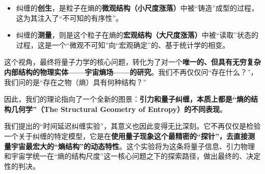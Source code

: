 \documentclass[12pt]{article}
\begin{document}
\begin{itemize}
    \item   纠缠的\textbf{创生}，是粒子在熵的\textbf{微观结构（小尺度涨落）}中被``铸造''成型的过程，这为其注入了``不可知的有序性''。
    \item   纠缠的\textbf{测量}，则是这个粒子在熵的\textbf{宏观结构（大尺度涨落）}中被``读取''状态的过程，这是一个``微观不可知''向``宏观确定''的、基于统计学的相变。
\end{itemize}

\noindent 这个视角，最终将量子力学的核心问题，转化为了对一个\textbf{唯一的、但具有无穷复杂内部结构的物理实体——宇宙熵场——的研究}。我们不再仅仅问``存在什么？''，我们问的是``存在之物（熵）具有何种结构？''

\noindent 因此，我们的理论指向了一个全新的图景：\textbf{引力和量子纠缠，本质上都是``熵的结构几何学''（The Structural Geometry of Entropy）的不同表现}。

\noindent 我们提出的``时间延迟纠缠实验''，其意义也因此变得无比深刻。它不再仅仅是检验一个关于纠缠的特定模型，它是在\textbf{使用量子现象这个最精密的``探针''，去直接测量宇宙最宏大的``熵结构''的动态特性}。这个实验将为这条将量子信息、引力物理和宇宙学统一在``熵的结构尺度''这一核心问题之下的探索路径，做出最终的、决定性的判决。
\end{document}
